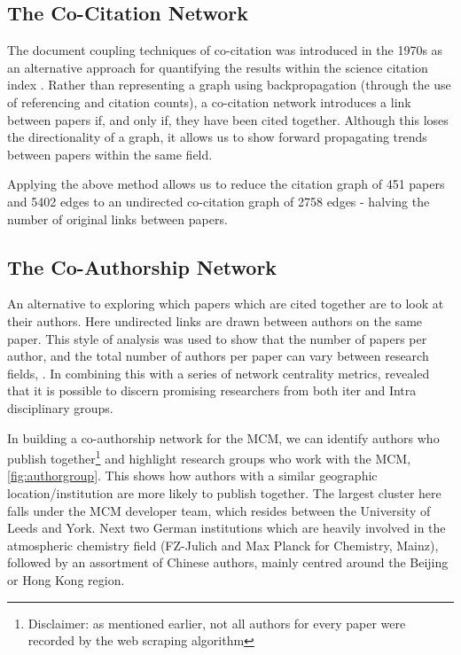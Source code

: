 \subsection{The Co-Citation Network}\label{sec:cocitep}

The document coupling techniques of co-citation was introduced in the 1970s as an alternative approach for quantifying the results within the science citation index \citep{cocite}. Rather than representing a graph using backpropagation (through the use of referencing and citation counts), a co-citation network introduces a link between papers if, and only if, they have been cited together. Although this loses the directionality of a graph, it allows us to show forward propagating trends between papers within the same field.

Applying the above method allows us to reduce the citation graph of 451 papers and 5402 edges to an undirected co-citation graph of 2758 edges - halving the number of original links between papers.

\subsection{The Co-Authorship Network}
An alternative to exploring which papers which are cited together are to look at their authors. Here undirected links are drawn between authors on the same paper. This style of analysis was used to show that the number of papers per author, and the total number of authors per paper can vary between research fields, \citep{newmancoauthor}. In combining this with a series of network centrality metrics, \citep{coauthornew} revealed that it is possible to discern promising researchers from both iter and Intra disciplinary groups.

In building a co-authorship network for the MCM, we can identify authors who publish together\footnote{ Disclaimer: as mentioned earlier, not all authors for every paper were recorded by the web scraping algorithm} and highlight research groups who work with the MCM, \autoref{fig:authorgroup}. This shows how authors with a similar geographic location/institution are more likely to publish together. The largest cluster here falls under the MCM developer team, which resides between the University of Leeds and York. Next two German institutions which are heavily involved in the atmospheric chemistry field (FZ-Julich and Max Planck for Chemistry, Mainz), followed by an assortment of Chinese authors, mainly centred around the Beijing or Hong Kong region.


